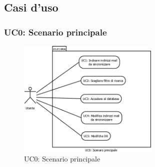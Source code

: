 \subsection{Casi d'uso}

\subsubsection[UC0: Scenario principale]{UC0: Scenario principale}
\begin{figure}[H]
  \begin{center}
\includegraphics[width=0.60\textwidth]{../template/img/UC0_ScenarioPrincipale.png}
\caption{UC0: Scenario principale}
\label{fig:UC0}
\end{center}
\end{figure}

